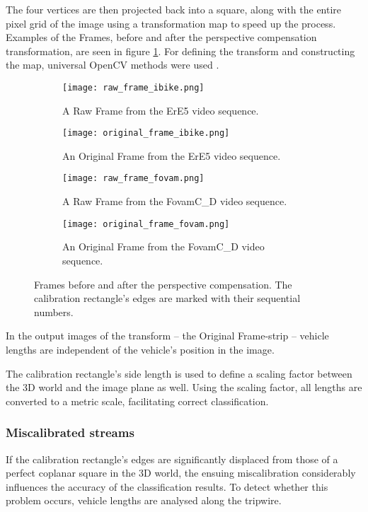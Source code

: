 The four vertices are then projected back into a square, along with the entire pixel grid of the image using a transformation map to speed up the process.
Examples of the Frames, before and after the perspective compensation transformation, are seen in figure \ref{fig:perscomp}.
For defining the transform and constructing the map, universal OpenCV methods were used \cite{PersTrans, WrapPers}.

\begin{figure}[!t]
	\centering
		\begin{subfigure}[b]{0.4\textwidth}
			\texttt{[image: raw\_frame\_ibike.png]}
			\caption{A Raw Frame from the ErE5 video sequence.}
		\end{subfigure}
		\quad
		\begin{subfigure}[b]{0.4\textwidth}
			\texttt{[image: original\_frame\_ibike.png]}
			\caption{An Original Frame from the ErE5 video sequence.}
		\end{subfigure}
		\hfill
		\begin{subfigure}[b]{0.4\textwidth}
			\texttt{[image: raw\_frame\_fovam.png]}
			\caption{A Raw Frame from the FovamC\_D video sequence.}
		\end{subfigure}
		\quad
		\begin{subfigure}[b]{0.4\textwidth}
			\texttt{[image: original\_frame\_fovam.png]}
			\caption{An Original Frame from the FovamC\_D video sequence.}
		\end{subfigure}
		
		\caption{Frames before and after the perspective compensation. The calibration rectangle's edges are marked with their sequential numbers.\label{fig:perscomp}}
\end{figure}

In the output images of the transform -- the Original Frame-strip --  vehicle lengths are independent of the vehicle's position in the image. 

The calibration rectangle's side length is used to define a scaling factor between the 3D world and the image plane as well.
Using the scaling factor, all lengths are converted to a metric scale, facilitating correct classification.

\subsubsection{Miscalibrated streams}
If the calibration rectangle's edges are significantly displaced from those of a perfect coplanar square in the 3D world, the ensuing miscalibration considerably influences the accuracy of the classification results.
To detect whether this problem occurs, vehicle lengths are analysed along the tripwire.

